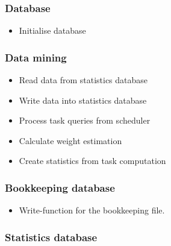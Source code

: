 {	\subsubsection{Database}
	
		\begin{itemize}
			\item Initialise database
		\end{itemize}
		
		\subsubsection{Data mining}
	
			\begin{itemize}
				\item Read data from statistics database
				\item Write data into statistics database
				\item Process task queries from scheduler
				\item Calculate weight estimation 
				\item Create statistics from task computation
			\end{itemize}
	
	
		
		
		\subsubsection{Bookkeeping database}
	
			\begin{itemize}
				\item Write-function for the bookkeeping file.
			\end{itemize}
	
		\subsubsection{Statistics database}
	
}
